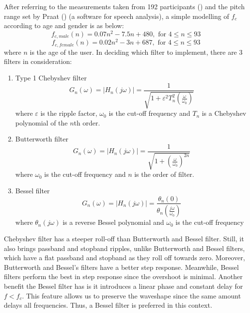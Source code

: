 After referring to the measurements taken from 192 participants (\cite{lifespan})
and the pitch range set by Praat (\cite{f0contour})
(a software for speech analysis), a simple modelling of $f_c$ according to age and gender is as below:
\[f_{c,male}(n) = 0.07n^2 - 7.5n + 480, \text{ for } 4 \leq n\leq 93 \label{male} \] 
\[f_{c,female}(n) = 0.02n^2 - 3n + 687, \text{ for } 4 \leq n \leq 93 \label{female} \] 
where $n$ is the age of the user.
In deciding which filter to implement, there are 3 filters in consideration:
\begin{enumerate}[label=(\alph*)]
    \item Type 1 Chebyshev filter
    \[G_{n}(\omega) = |H_{n}(j\omega)| = {\frac{1}{\sqrt{1+\varepsilon^{2} T_{n}^{2}(\frac{\omega}{\omega_{0}})}}}\]
    where $\varepsilon$  is the ripple factor, $\omega _{0}$ is the cut-off frequency
    and $T_{n}$ is a Chebyshev polynomial of the $n$th order.
    \item Butterworth filter
    \[G_{n}(\omega) = |H_{n}(j\omega)| = {\frac{1}{\sqrt{1+(\frac{\omega}{\omega_{0}})^{2n}}}}\]
    where $\omega _{0}$ is the cut-off frequency and $n$ is the order of filter.
    \item Bessel filter
    \[G_{n}(\omega) = |H_{n}(j\omega)| ={\frac {\theta _{n}(0)}{\theta _{n}(\frac{j\omega}{\omega _{0}})}}\]
    where $\theta _{n}(j\omega)$ is a reverse Bessel polynomial and $\omega _{0}$ is the cut-off frequency
\end{enumerate}

Chebyshev filter has a steeper roll-off than Butterworth and Bessel filter. Still, it also brings passband and stopband ripples, 
unlike Butterworth and Bessel filters, which have a flat passband and stopband as they roll off towards zero. Moreover, Butterworth 
and Bessel's filters have a better step response. Meanwhile, Bessel filters perform the best in step response since the overshoot is
minimal. Another benefit the Bessel filter has is it introduces a linear phase and constant delay for $f<f_c$. This
feature allows us to preserve the waveshape since the same amount delays all frequencies.
Thus, a Bessel filter is preferred in this context.

